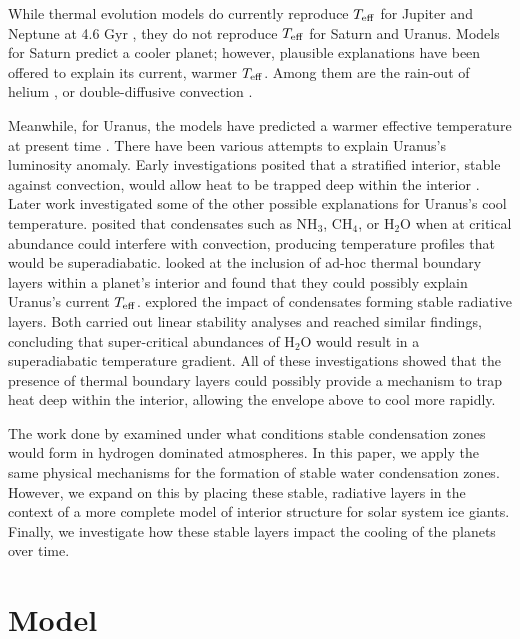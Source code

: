 \documentclass[11pt]{ucscthesisbs}
\begin{document}
\renewcommand{\arraystretch}{1}
While thermal evolution models do currently reproduce $T_{\rm eff}$ for Jupiter and Neptune at 4.6 Gyr \citep{graboske_1975,fortney_2011}, they do not reproduce $T_{\rm eff}$ for Saturn and Uranus. Models for Saturn predict a cooler planet; however, plausible explanations have been offered to explain its current, warmer $T_{\rm eff}$. Among them are the rain-out of helium \citep{fortney_hubbard_2003, 2020ApJ...889...51M}, or double-diffusive convection \citep{leconte_chabrier_2013}. 

Meanwhile, for Uranus, the models have predicted a warmer effective temperature at present time \citep{fortney_2011, podolak_1991, hubbard_1995, 2019A&A...632A..70S}. There have been various attempts to explain Uranus's luminosity anomaly. Early investigations posited that a stratified interior, stable against convection, would allow heat to be trapped deep within the interior \citep{podolak_1991}. Later work investigated some of the other possible explanations for Uranus's cool temperature. \citep{guillot_1995} posited that condensates such as NH$_{3}$, CH$_{4}$, or H$_{2}$O when at critical abundance could interfere with convection, producing temperature profiles that would be superadiabatic. \citep{nettelmann_2016} looked at the inclusion of ad-hoc thermal boundary layers within a planet's interior and found that they could possibly explain Uranus's current $T_{\rm eff}$. \citep{friedson_2017,leconte_2017} explored the impact of condensates forming stable radiative layers. Both carried out linear stability analyses and reached similar findings, concluding that super-critical abundances of H$_{2}$O would result in a superadiabatic temperature gradient. All of these investigations showed that the presence of thermal boundary layers could possibly provide a mechanism to trap heat deep within the interior, allowing the envelope above to cool more rapidly.

The work done by \citep{guillot_1995,friedson_2017,leconte_2017} examined under what conditions stable condensation zones would form in hydrogen dominated atmospheres. In this paper, we apply the same physical mechanisms for the formation of stable water condensation zones. However, we expand on this by placing these stable, radiative layers in the context of a more complete model of interior structure for solar system ice giants. Finally, we investigate how these stable layers impact the cooling of the planets over time. 


\chapter{Model}
\end{document}
